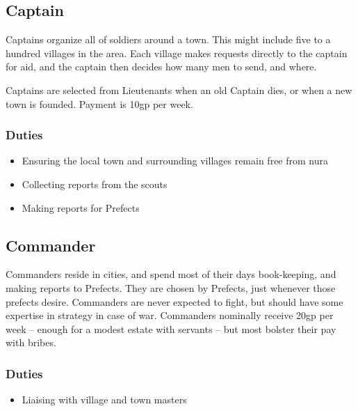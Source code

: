 \begin{multicols}{2}
\subsection{Captain}

Captains organize all of soldiers around a town.
This might include five to a hundred villages in the area.
Each village makes requests directly to the captain for aid, and the captain then decides how many men to send, and where.

Captains are selected from Lieutenants when an old Captain dies, or when a new town is founded.
Payment is 10gp per week.

\subsubsection{Duties}

\begin{itemize}

  \item{Ensuring the local town and surrounding villages remain free from nura}
  \item{Collecting reports from the scouts}
  \item{Making reports for Prefects}

\end{itemize}

\subsection{Commander}

Commanders reside in cities, and spend most of their days book-keeping, and making reports to Prefects.
They are chosen by Prefects, just whenever those prefects desire.
Commanders are never expected to fight, but should have some expertise in strategy in case of war.
Commanders nominally receive 20gp per week -- enough for a modest estate with servants -- but most bolster their pay with bribes.

\subsubsection{Duties}

\begin{itemize}

  \item{Liaising with village and town masters}

\end{itemize}


\end{multicols}
